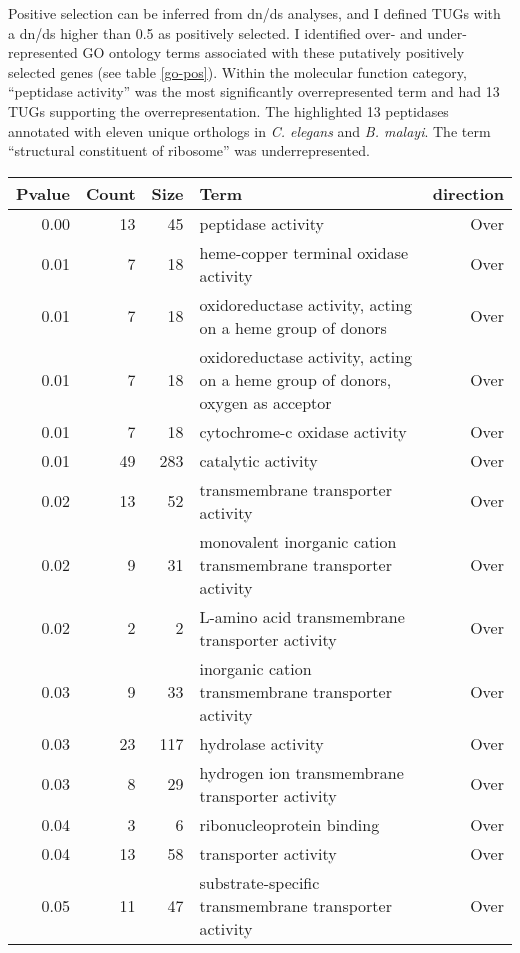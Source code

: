 Positive selection can be inferred from dn/ds analyses, and I defined
TUGs with a dn/ds higher than 0.5 as positively selected. I
identified over- and under-represented GO ontology terms associated
with these putatively positively selected genes (see table
\ref{go-pos}). Within the molecular function category, ``peptidase
activity'' was the most significantly overrepresented term and had 13
TUGs supporting the overrepresentation. The highlighted 13 peptidases
annotated with eleven unique orthologs in \textit{C. elegans} and
\textit{B. malayi}.  The term ``structural constituent of ribosome''
was underrepresented.

\begin{longtable}{rrrp{7cm}r}
 Pvalue & Count & Size & Term & direction \\ 
  \hline
0.00 &  13 &  45 & peptidase activity & Over \\ 
  0.01 &   7 &  18 & heme-copper terminal oxidase activity & Over \\ 
  0.01 &   7 &  18 & oxidoreductase activity, acting on a heme group of donors & Over \\ 
  0.01 &   7 &  18 & oxidoreductase activity, acting on a heme group of donors, oxygen as acceptor & Over \\ 
  0.01 &   7 &  18 & cytochrome-c oxidase activity & Over \\ 
  0.01 &  49 & 283 & catalytic activity & Over \\ 
  0.02 &  13 &  52 & transmembrane transporter activity & Over \\ 
  0.02 &   9 &  31 & monovalent inorganic cation transmembrane transporter activity & Over \\ 
  0.02 &   2 &   2 & L-amino acid transmembrane transporter activity & Over \\ 
  0.03 &   9 &  33 & inorganic cation transmembrane transporter activity & Over \\ 
  0.03 &  23 & 117 & hydrolase activity & Over \\ 
  0.03 &   8 &  29 & hydrogen ion transmembrane transporter activity & Over \\ 
  0.04 &   3 &   6 & ribonucleoprotein binding & Over \\ 
  0.04 &  13 &  58 & transporter activity & Over \\ 
  0.05 &  11 &  47 & substrate-specific transmembrane transporter activity & Over \\ 

\end{longtable}
